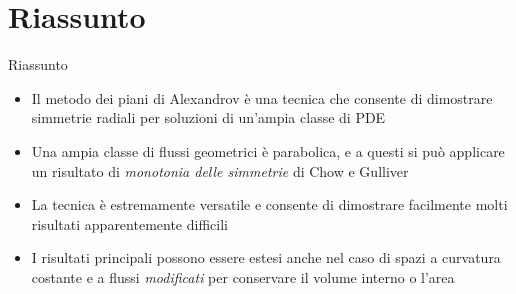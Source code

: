 \section{Riassunto}
\begin{frame}{Riassunto}{}
	\begin{itemize}
		\item Il metodo dei piani di Alexandrov è una tecnica che consente di dimostrare simmetrie radiali per soluzioni di un'ampia classe di PDE
		\item<2-> Una ampia classe di flussi geometrici è parabolica, e a questi si può applicare un risultato di \textit{monotonia delle simmetrie} di Chow e Gulliver
		\item<3-> La tecnica è estremamente versatile e consente di dimostrare facilmente molti risultati apparentemente difficili
		\item<4-> I risultati principali possono essere estesi anche nel caso di spazi a curvatura costante e a flussi \textit{modificati} per conservare il volume interno o l'area
	\end{itemize}
\end{frame}

\frame{\titlepage}
